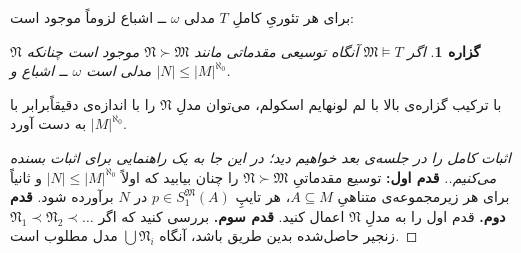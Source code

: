 \documentclass[12pt,a4paper]{report}
\theoremstyle{colorhead}
\newtheorem{prop}[thm]{گزاره}
\begin{document}
برای هر تئوریِ کاملِ
$T$
مدلی 
$\omega$ 
ــ
اشباع لزوماً موجود است:
\begin{prop}
\label{vojudeakande}
اگر
$\mathfrak{M}\models T$
آنگاه توسیعی مقدماتی مانند
$\mathfrak{N}\succ \mathfrak{M}$
موجود است چنانکه 
$\mathfrak{N}$
مدلی است
$\omega$ ــ
اشباع و 
$|N|\leq |M|^{\aleph_0}$.
\end{prop}
با ترکیب گزاره‌ی بالا با لم لونهایم اسکولم، می‌توان مدلِ
$\mathfrak{N}$
را با اندازه‌ی دقیقاً‌برابر با
$|M|^{\aleph_0}$
به دست آورد.
\begin{proof}[اثبات کامل را در جلسه‌ی بعد خواهیم دید؛ در این جا به یک راهنمایی برای اثبات بسنده می‌کنیم.]
\hfill \newline
\textbf{قدم اول:}
توسیع مقدماتیِ
$\mathfrak{N}\succ \mathfrak{M}$
را چنان بیابید که
اولاً
$|N|\leq |M|^{\aleph_0}$
و ثانیاً برای هر زیرمجموعه‌ی متناهیِ
$A\subseteq M$،
هر تایپِ
$p\in S_1^\mathfrak{M}(A)$
در
$N$
برآورده شود. 
\newline
\textbf{قدم دوم.}
قدم اول را به مدلِ
$\mathfrak{N}$
اعمال کنید.
\newline
\textbf{قدم سوم.}
بررسی کنید که
اگر
$\mathfrak{N}_1\prec \mathfrak{N}_2\prec \ldots$
زنجیر حاصل‌شده بدین طریق باشد، آنگاه
$\bigcup \mathfrak{N}_i$
مدل مطلوب است. 
\end{proof}
\pagebreak
\end{document}
